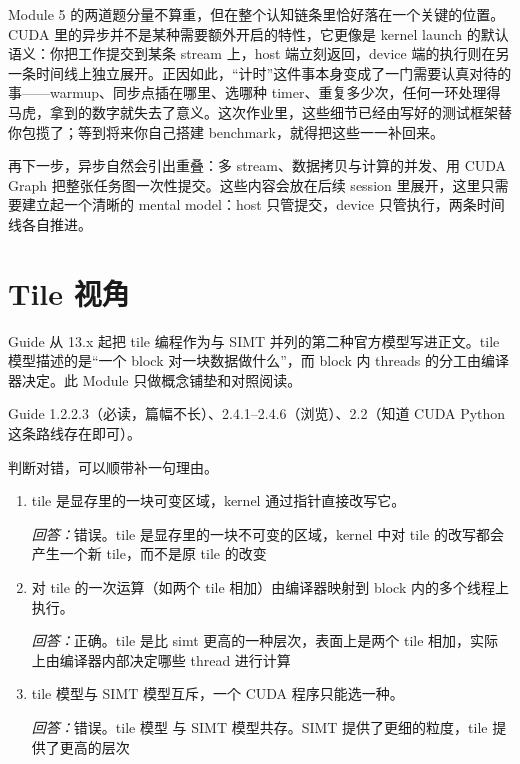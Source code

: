 \documentclass[11pt,a4paper,fontset=none]{ctexart}
\begin{document}
\begin{lookback}
Module 5 的两道题分量不算重，但在整个认知链条里恰好落在一个关键的位置。CUDA 里的异步并不是某种需要额外开启的特性，它更像是 kernel launch 的默认语义：你把工作提交到某条 stream 上，host 端立刻返回，device 端的执行则在另一条时间线上独立展开。正因如此，“计时”这件事本身变成了一门需要认真对待的事——warmup、同步点插在哪里、选哪种 timer、重复多少次，任何一环处理得马虎，拿到的数字就失去了意义。这次作业里，这些细节已经由写好的测试框架替你包揽了；等到将来你自己搭建 benchmark，就得把这些一一补回来。

再下一步，异步自然会引出重叠：多 stream、数据拷贝与计算的并发、用 CUDA Graph 把整张任务图一次性提交。这些内容会放在后续 session 里展开，这里只需要建立起一个清晰的 mental model：host 只管提交，device 只管执行，两条时间线各自推进。
\end{lookback}

\section{Tile 视角}

Guide 从 13.x 起把 tile 编程作为与 SIMT 并列的第二种官方模型写进正文。tile 模型描述的是“一个 block 对一块数据做什么”，而 block 内 threads 的分工由编译器决定。此 Module 只做概念铺垫和对照阅读。

\begin{reading}
Guide 1.2.2.3（必读，篇幅不长）、2.4.1--2.4.6（浏览）、2.2（知道 CUDA Python 这条路线存在即可）。
\end{reading}

判断对错，可以顺带补一句理由。
\begin{enumerate}[label=(\alph*)]
  \item tile 是显存里的一块可变区域，kernel 通过指针直接改写它。
  \par\noindent\textit{回答：}错误。tile 是显存里的一块不可变的区域，kernel 中对 tile 的改写都会产生一个新 tile，而不是原 tile 的改变
  \item 对 tile 的一次运算（如两个 tile 相加）由编译器映射到 block 内的多个线程上执行。
  \par\noindent\textit{回答：}正确。tile 是比 simt 更高的一种层次，表面上是两个 tile 相加，实际上由编译器内部决定哪些 thread 进行计算
  \item tile 模型与 SIMT 模型互斥，一个 CUDA 程序只能选一种。
  \par\noindent\textit{回答：}错误。tile 模型 与 SIMT 模型共存。SIMT 提供了更细的粒度，tile 提供了更高的层次
\end{enumerate}
\end{document}

